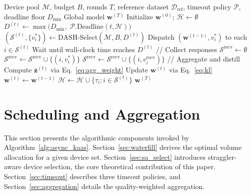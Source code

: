 \documentclass[a4paper,fleqn]{cas-dc}
\newcommand{\Dref}{\mathcal{D}_{\mathrm{ref}}}
\newcommand{\Mset}{\mathcal{M}}
\newcommand{\Sset}{\mathcal{S}}
\newcommand{\Srecv}{\mathcal{S}^{\mathrm{recv}}}
\begin{document}
	\begin{algorithm}[t]
		\caption{DASH: Asynchronous FD Scheduling Protocol}
		\label{alg:async_kaas}
		\begin{algorithmic}[1]
			\REQUIRE Device pool $\Mset$, budget $B$, rounds $T$,
			reference dataset $\Dref$, timeout policy $\mathcal{P}$,
			deadline floor $D_{\min}$
			\ENSURE Global model $\mathbf{w}^{(T)}$
			\STATE Initialize $\mathbf{w}^{(0)}$;\;
			$\mathcal{H} \gets \emptyset$
			\STATE $D^{(t)} \!\gets\!
			\max\bigl(D_{\min},\;
			\mathcal{P}.\mathrm{Deadline}(t, \mathcal{H})\bigr)$
			\STATE $(\Sset^{(t)}\!, \{v_i^*\}) \!\gets\!
			\mathrm{DASH\text{-}Select}(\Mset, B, D^{(t)})$
			\STATE Dispatch $(\mathbf{w}^{(t-1)}, v_i^*)$
			to each $i \in \Sset^{(t)}$
			\STATE Wait until wall-clock time reaches $D^{(t)}$
			\STATE // Collect responses
			\STATE $\Srecv \gets \emptyset$
			\FOR{each $i \in \Sset^{(t)}$}
			\STATE $\Srecv \!\gets\! \Srecv \cup \{(i, v_i^*)\}$
			\STATE $\Srecv \!\gets\! \Srecv
			\cup \{(i, v_i^{\mathrm{recv}})\}$
			\ENDIF
			\ENDFOR
			\STATE // Aggregate and distill
			\IF{$\Srecv \neq \emptyset$}
			\STATE Compute $\bar{\mathbf{z}}^{(t)}$
			via Eq.~\eqref{eq:agg_weight}
			\STATE Update $\mathbf{w}^{(t)}$
			via Eq.~\eqref{eq:kl}
			\ELSE
			\STATE $\mathbf{w}^{(t)} \!\gets\! \mathbf{w}^{(t-1)}$
			\ENDIF
			\STATE $\mathcal{H} \!\gets\! \mathcal{H}
			\cup \{\tau_i : i \in \Sset^{(t)}\}$
			\ENDFOR
			\RETURN $\mathbf{w}^{(T)}$
		\end{algorithmic}
	\end{algorithm}
	
	
	\section{Scheduling and Aggregation}\label{sec:scheduling}
	
	This section presents the algorithmic components invoked by
	Algorithm~\ref{alg:async_kaas}.  Section~\ref{sec:waterfill} derives
	the optimal volume allocation for a given device set.
	Section~\ref{sec:sa_select} introduces straggler-aware device
	selection, the core theoretical contribution of this paper.
	Section~\ref{sec:timeout} describes three timeout policies, and
	Section~\ref{sec:aggregation} details the quality-weighted
	aggregation.
	
\end{document}

